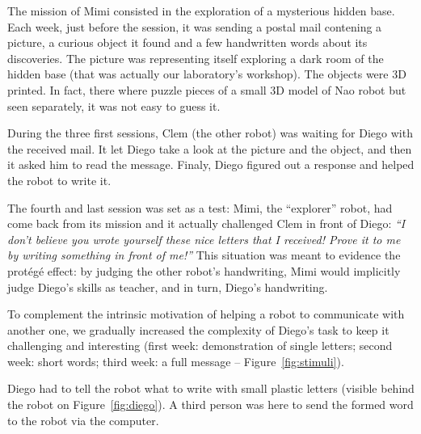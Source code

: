 \documentclass{sig-alternate}
\begin{document}
The mission of Mimi consisted in the exploration of a mysterious hidden
base. Each week, just before the session, it was sending a postal mail contening
a picture, a curious object it found and a few handwritten words about its discoveries. 
The picture was representing itself exploring 
a dark room of the hidden base (that was actually our laboratory's workshop). 
The objects were 3D printed. In fact, there where puzzle pieces of a small 3D 
model of Nao robot but seen separately, it was not easy to guess it.

During the three first sessions, Clem (the other robot) was waiting for Diego
with the received mail. It let Diego take a look at the picture and the object,
and then it asked him to read the message.
Finaly, Diego figured out a response and helped the robot to write it.

The fourth and last session was set as a test: Mimi, the ``explorer'' robot,
had come back from its mission and it actually challenged Clem in
front of Diego: \emph{``I don't believe you wrote yourself these nice letters that I
received! Prove it to me by writing something in front of me!''} This situation
was meant to evidence the prot\'eg\'e effect: by judging the other robot's
handwriting, Mimi would implicitly judge Diego's skills as
teacher, and in turn, Diego's handwriting.

To complement the intrinsic motivation of helping a robot to communicate with another one, we
gradually increased the complexity of Diego's task to keep it challenging and
interesting (first week: demonstration of single letters; second week:
short words; third week: a full message -- Figure~\ref{fig:stimuli}).

Diego had to tell the robot what to write with small plastic letters (visible
behind the robot on Figure~\ref{fig:diego}). A third person was here to send
the formed word to the robot via the computer.

\end{document}
